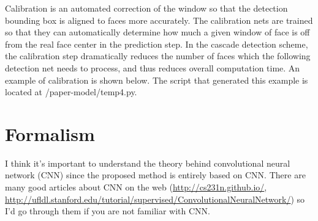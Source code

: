 \documentclass[twoside]{article}
\theoremstyle{definition}
\theoremstyle{definition}
\theoremstyle{remark}
\begin{document}
Calibration is an automated correction of the window so that the detection bounding box is aligned to faces more accurately. The calibration nets are trained so that they can automatically determine how much a given window of face is off from the real face center in the prediction step. In the cascade detection scheme, the calibration step dramatically reduces the number of faces which the following detection net needs to process, and thus reduces overall computation time. An example of calibration is shown below. The script that generated this example is located at /paper-model/temp4.py.


\section{Formalism}

I think it's important to understand the theory behind convolutional neural network (CNN) since the proposed method is entirely based on CNN. There are many good articles about CNN on the web (\url{http://cs231n.github.io/}, \url{http://ufldl.stanford.edu/tutorial/supervised/ConvolutionalNeuralNetwork/}) so I'd go through them if you are not familiar with CNN. 
\end{document}

